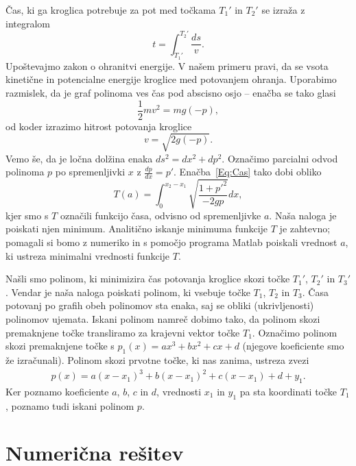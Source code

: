 \documentclass[a4paper]{article}
\begin{document}
Čas, ki ga kroglica potrebuje za pot med točkama $T_{1}'$ in $T_{2}'$ se izraža z integralom 
\begin{equation}
\label{Eq:Cas}
t = \int_{T_{1}'}^{T_{2}'} \frac{ds}{v}.
\end{equation}
%
Upoštevajmo zakon o ohranitvi energije. V našem primeru pravi, da se vsota kinetične in potencialne energije kroglice med potovanjem ohranja. Uporabimo razmislek, da je graf polinoma ves čas pod abscisno osjo -- enačba se tako glasi
\begin{equation*}
\frac{1}{2}mv^2 = mg(-p),
\end{equation*}
od koder izrazimo hitrost potovanja kroglice
\begin{equation*}
v = \sqrt{2g(-p)}.
\end{equation*}
%
Vemo še, da je ločna dolžina enaka $ds^2 = dx^2 + dp^2$. Označimo parcialni odvod polinoma $p$ po spremenljivki $x$ z $\frac{dp}{dx}=p'$. Enačba~\eqref{Eq:Cas} tako dobi obliko
\begin{equation}
\label{Eq:CasInt}
T(a) = \int_{0}^{x_2-x_1} \sqrt{ \frac{1+p'^2}{-2gp}} dx,
\end{equation}
kjer smo s $T$ označili funkcijo časa, odvisno od spremenljivke $a$. Naša naloga je poiskati njen minimum.
Analitično iskanje minimuma funkcije $T$ je zahtevno; pomagali si bomo z numeriko in s pomočjo programa Matlab poiskali vrednost $a$, ki ustreza minimalni vrednosti funkcije $T$.

Našli smo polinom, ki minimizira čas potovanja kroglice skozi točke $T_{1}'$, $T_{2}'$ in $T_{3}'$. Vendar je naša naloga poiskati polinom, ki vsebuje točke $T_1$, $T_2$ in $T_3$. Časa potovanj po grafih obeh polinomov sta enaka, saj se obliki (ukrivljenosti) polinomov ujemata. Iskani polinom namreč dobimo tako, da polinom skozi premaknjene točke transliramo za krajevni vektor točke $T_1$.
Označimo polinom skozi premaknjene točke s $p_1(x) = ax^3+bx^2+cx+d$ (njegove koeficiente smo že izračunali). Polinom skozi prvotne točke, ki nas zanima, ustreza zvezi
\begin{align}
p(x) = a(x-x_1)^3 + b(x-x_1)^2 + c(x-x_1) + d + y_1.
\end{align}
Ker poznamo koeficiente $a$, $b$, $c$ in $d$, vrednosti $x_1$ in $y_1$ pa sta koordinati točke $T_1$, poznamo tudi iskani polinom $p$.

\section{Numerična rešitev}
\end{document}
